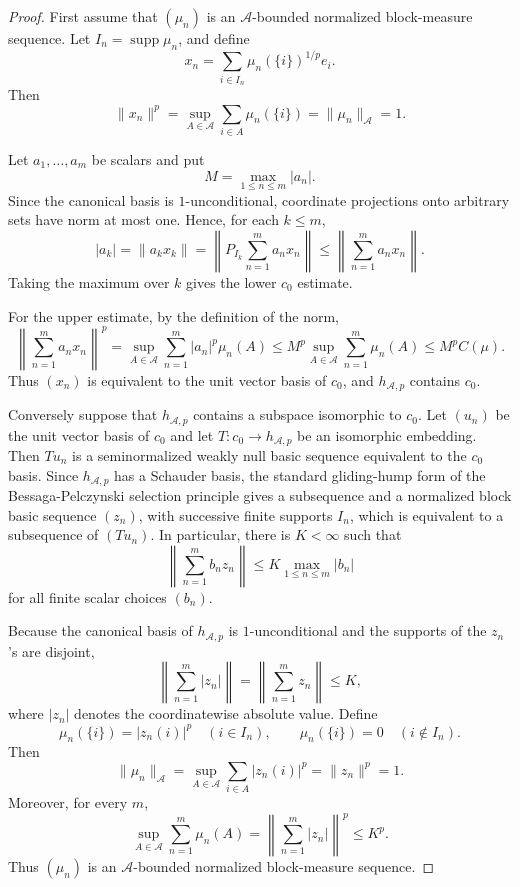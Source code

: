 \documentclass[11pt]{article}
\newcommand{\A}{\mathcal A}
\newcommand{\supp}{\operatorname{supp}}
\begin{document}
\begin{proof}
First assume that \((\mu_n)\) is an \(\A\)-bounded normalized block-measure
sequence. Let \(I_n=\supp\mu_n\), and define
\[
  x_n=\sum_{i\in I_n}\mu_n(\{i\})^{1/p}e_i .
\]
Then
\[
  \|x_n\|^p
  =
  \sup_{A\in\A}\sum_{i\in A}\mu_n(\{i\})
  =
  \|\mu_n\|_{\A}=1.
\]

Let \(a_1,\ldots,a_m\) be scalars and put
\[
  M=\max_{1\leq n\leq m}|a_n|.
\]
Since the canonical basis is \(1\)-unconditional, coordinate projections onto
arbitrary sets have norm at most one. Hence, for each \(k\leq m\),
\[
  |a_k|
  =
  \|a_k x_k\|
  =
  \left\|P_{I_k}\sum_{n=1}^{m}a_nx_n\right\|
  \leq
  \left\|\sum_{n=1}^{m}a_nx_n\right\|.
\]
Taking the maximum over \(k\) gives the lower \(c_0\) estimate.

For the upper estimate, by the definition of the norm,
\[
 \left\|\sum_{n=1}^{m}a_nx_n\right\|^p
 =
 \sup_{A\in\A}\sum_{n=1}^{m}|a_n|^p\mu_n(A)
 \leq
 M^p \sup_{A\in\A}\sum_{n=1}^{m}\mu_n(A)
 \leq
 M^p C(\mu).
\]
Thus \((x_n)\) is equivalent to the unit vector basis of \(c_0\), and
\(h_{\A,p}\) contains \(c_0\).

Conversely suppose that \(h_{\A,p}\) contains a subspace isomorphic to
\(c_0\). Let \((u_n)\) be the unit vector basis of \(c_0\) and let
\(T:c_0\to h_{\A,p}\) be an isomorphic embedding. Then \(T u_n\) is a
seminormalized weakly null basic sequence equivalent to the \(c_0\) basis.
Since \(h_{\A,p}\) has a Schauder basis, the standard gliding-hump form of the
Bessaga-Pelczynski selection principle gives a subsequence and a normalized
block basic sequence \((z_n)\), with successive finite supports \(I_n\), which
is equivalent to a subsequence of \((T u_n)\). In particular, there is \(K<\infty\)
such that
\[
  \left\|\sum_{n=1}^{m} b_n z_n\right\|
  \leq
  K\max_{1\leq n\leq m}|b_n|
\]
for all finite scalar choices \((b_n)\).

Because the canonical basis of \(h_{\A,p}\) is \(1\)-unconditional and the
supports of the \(z_n\)'s are disjoint,
\[
  \left\|\sum_{n=1}^{m}|z_n|\right\|
  =
  \left\|\sum_{n=1}^{m}z_n\right\|
  \leq K,
\]
where \(|z_n|\) denotes the coordinatewise absolute value. Define
\[
  \mu_n(\{i\})=|z_n(i)|^p\quad (i\in I_n),
  \qquad
  \mu_n(\{i\})=0\quad (i\notin I_n).
\]
Then
\[
  \|\mu_n\|_{\A}
  =
  \sup_{A\in\A}\sum_{i\in A}|z_n(i)|^p
  =
  \|z_n\|^p=1.
\]
Moreover, for every \(m\),
\[
  \sup_{A\in\A}\sum_{n=1}^{m}\mu_n(A)
  =
  \left\|\sum_{n=1}^{m}|z_n|\right\|^p
  \leq K^p.
\]
Thus \((\mu_n)\) is an \(\A\)-bounded normalized block-measure sequence.
\end{proof}
\end{document}

